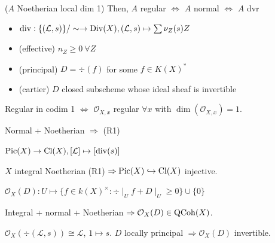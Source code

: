 \begin{proposition} ($A$ Noetherian local dim 1)
Then, $A$ regular $ \Leftrightarrow $ $A$ normal $ \Leftrightarrow $ $A$ dvr
\end{proposition}

\begin{definition}
\begin{itemize}[topsep=-6pt, itemsep=0pt]
    \item $\operatorname{div} : \{(\mathcal{L}, s )\} / \sim \to \operatorname{Div}(X), (\mathcal{L}, s) \mapsto \sum \nu _Z(s) Z$
    \item (effective) $n_Z \geq 0 \ \forall  Z$
    \item (principal) $D = \div (f)$ for some $f \in K(X)^*$
    \item (cartier) $D$ closed subscheme whose ideal sheaf is invertible
\end{itemize}
\end{definition}

\begin{definition}[R1] Regular in codim 1 $ \Leftrightarrow $ $\mathcal{O}_{X, x}$ regular $\forall x$ with $\dim (\mathcal{O}_{X,x}) = 1$.
\end{definition}

\begin{proposition} Normal + Noetherian $ \Rightarrow $ (R1)
\end{proposition}

\begin{proposition} $\operatorname{Pic} (X) \to \operatorname{Cl}(X), [\mathcal{L} ] \mapsto [\operatorname{div} (s)]$
\end{proposition}

\begin{proposition} $X$ integral Noetherian (R1) $ \Rightarrow \operatorname{Pic}(X) \hookrightarrow \operatorname{Cl}(X)$ injective.
\end{proposition}

\begin{definition} $\mathcal{O}_X (D) : U \mapsto \{f \in k(X)^{\times } : \div \mid _U f + D\mid _U \geq 0\} \cup \{0\}$
\end{definition}

\begin{proposition} Integral + normal + Noetherian $ \Rightarrow \mathcal{O}_X(D) \in \operatorname{QCoh}(X)$.
\end{proposition}

\begin{proposition}
$\mathcal{O}_X (\div (\mathcal{L}, s)) \cong \mathcal{L}$, $1 \mapsto s$. $D$ locally principal $ \Rightarrow \mathcal{O}_X(D) $ invertible.
\end{proposition}

